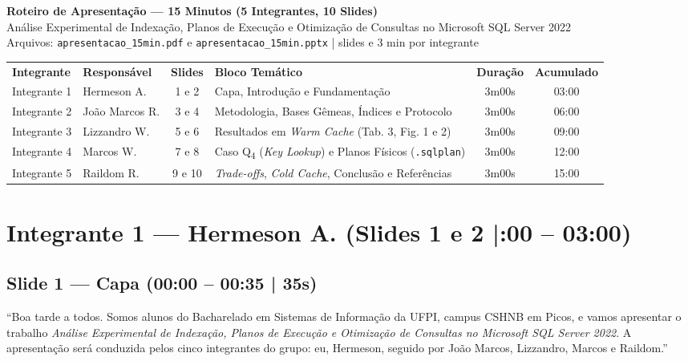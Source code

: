 \documentclass[10pt,a4paper]{article}
\begin{document}
\begin{center}
  {\LARGE\bfseries Roteiro de Apresentação — 15 Minutos (5 Integrantes, 10 Slides)}\\[6pt]
  {\normalsize\color{InkDark} Análise Experimental de Indexação, Planos de Execução e Otimização de Consultas no Microsoft SQL Server 2022}\\[4pt]
  {\small\color{InkDark} Arquivos: \texttt{apresentacao\_15min.pdf} e \texttt{apresentacao\_15min.pptx} \quad| slides e 3 min por integrante}
\end{center}

\vspace{6pt}

\begin{center}
\small
\setlength{\tabcolsep}{7pt}
\renewcommand{\arraystretch}{1.25}
\begin{tabular}{@{}llclcc@{}}
  \rowcolor{TblHead}
  \textbf{\color{white}Integrante} & \textbf{\color{white}Responsável} & \textbf{\color{white}Slides} & \textbf{\color{white}Bloco Temático} & \textbf{\color{white}Duração} & \textbf{\color{white}Acumulado} \\
  Integrante 1 & Hermeson A. & 1 e 2 & Capa, Introdução e Fundamentação & 3m00s & 03:00 \\
  \rowcolor{TblStripe}
  Integrante 2 & João Marcos R. & 3 e 4 & Metodologia, Bases Gêmeas, Índices e Protocolo & 3m00s & 06:00 \\
  Integrante 3 & Lizzandro W. & 5 e 6 & Resultados em \textit{Warm Cache} (Tab. 3, Fig. 1 e 2) & 3m00s & 09:00 \\
  \rowcolor{TblStripe}
  Integrante 4 & Marcos W. & 7 e 8 & Caso Q\textsubscript{4} (\textit{Key Lookup}) e Planos Físicos (\texttt{.sqlplan}) & 3m00s & 12:00 \\
  Integrante 5 & Raildom R. & 9 e 10 & \textit{Trade-offs}, \textit{Cold Cache}, Conclusão e Referências & 3m00s & 15:00 \\
\end{tabular}
\end{center}

\section{Integrante 1 — Hermeson A. (Slides 1 e 2 \enspace|:00 – 03:00)}

\subsection{Slide 1 — Capa (00:00 – 00:35 | 35s)}
\begin{fala}
``Boa tarde a todos. Somos alunos do Bacharelado em Sistemas de Informação da UFPI, campus CSHNB em Picos, e vamos apresentar o trabalho \textit{Análise Experimental de Indexação, Planos de Execução e Otimização de Consultas no Microsoft SQL Server 2022}. A apresentação será conduzida pelos cinco integrantes do grupo: eu, Hermeson, seguido por João Marcos, Lizzandro, Marcos e Raildom.''
\end{fala}
\end{document}
